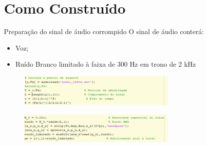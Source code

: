 \section{Como Construído}

\begin{frame}{Preparação do sinal de áudio corrompido}
	O sinal de áudio conterá:
	\begin{itemize}
	    \item Voz;
	    \item Ruído Branco limitado à faixa de 300 Hz em trono de 2 kHz
	\end{itemize}
	    \begin{figure}[!htb]
        \includegraphics[width=0.7\textwidth]{graficos/code_audio.png}
        \end{figure} 
    	\begin{figure}[!htb]
        \includegraphics[width=0.7\textwidth]{graficos/code_ruido.png}
        \end{figure} 

\end{frame}

